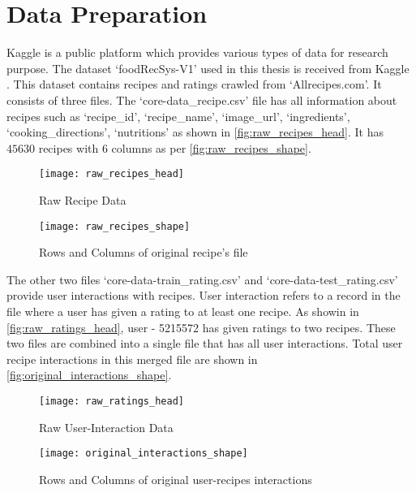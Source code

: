 
\section{Data Preparation}
\label{sec:data_prep}
Kaggle is a public platform which provides various types of data for research purpose. The dataset `foodRecSys-V1' used in this thesis is received from Kaggle \cite{48}. This dataset contains recipes and ratings crawled from `Allrecipes.com'. It consists of three files. The `core-data\_recipe.csv' file has all information about recipes such as `recipe\_id', `recipe\_name', `image\_url', `ingredients', `cooking\_directions', `nutritions' as shown in \autoref{fig:raw_recipes_head}. It has $45630$ recipes with $6$ columns as per \autoref{fig:raw_recipes_shape}.
\begin{singlespace}
\begin{figure}[H]
	\centering
	\texttt{[image: raw\_recipes\_head]}
	\caption{Raw Recipe Data}
	\label{fig:raw_recipes_head}
\end{figure}
\end{singlespace}

\begin{singlespace}
\begin{figure}[H]
	\centering
	\texttt{[image: raw\_recipes\_shape]}
	\caption{Rows and Columns of original recipe's file}
	\label{fig:raw_recipes_shape}
\end{figure}
\end{singlespace}

\noindent The other two files `core-data-train\_rating.csv' and `core-data-test\_rating.csv' provide user interactions with recipes. User interaction refers to a record in the file where a user has given a rating to at least one recipe. As showin in \autoref{fig:raw_ratings_head}, user - 5215572 has given ratings to two recipes. These two files are combined into a single file that has all user interactions.  Total user recipe interactions in this merged file are shown in \autoref{fig:original_interactions_shape}.

\begin{singlespace}
\begin{figure}[H]
	\centering
	\texttt{[image: raw\_ratings\_head]}
	\caption{Raw User-Interaction Data}
	\label{fig:raw_ratings_head}
\end{figure}
\end{singlespace}

\begin{singlespace}
\begin{figure}[H]
	\centering
	\texttt{[image: original\_interactions\_shape]}
	\caption{Rows and Columns of original user-recipes interactions }
	\label{fig:original_interactions_shape}
\end{figure}  
\end{singlespace}

